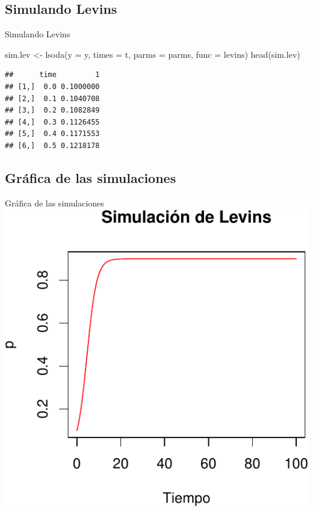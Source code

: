 \documentclass[
  11pt,
  ignorenonframetext,
]{beamer}
\newenvironment{Shaded}{}{}
\newcommand{\AttributeTok}[1]{\textcolor[rgb]{0.49,0.56,0.16}{#1}}
\newcommand{\FunctionTok}[1]{\textcolor[rgb]{0.02,0.16,0.49}{#1}}
\newcommand{\NormalTok}[1]{#1}
\newcommand{\OtherTok}[1]{\textcolor[rgb]{0.00,0.44,0.13}{#1}}
\begin{document}
\hypertarget{simulando-levins}{%
\subsection{Simulando Levins}\label{simulando-levins}}

\begin{frame}[fragile]{Simulando Levins}
\begin{Shaded}
\begin{Highlighting}[]
\NormalTok{sim.lev }\OtherTok{\textless{}{-}} \FunctionTok{lsoda}\NormalTok{(}\AttributeTok{y =}\NormalTok{ y, }\AttributeTok{times =}\NormalTok{ t, }
                 \AttributeTok{parms =}\NormalTok{ parms,}
                 \AttributeTok{func =}\NormalTok{ levins)}
\FunctionTok{head}\NormalTok{(sim.lev)}
\end{Highlighting}
\end{Shaded}

\begin{verbatim}
##      time         1
## [1,]  0.0 0.1000000
## [2,]  0.1 0.1040708
## [3,]  0.2 0.1082849
## [4,]  0.3 0.1126455
## [5,]  0.4 0.1171553
## [6,]  0.5 0.1218178
\end{verbatim}
\end{frame}

\hypertarget{gruxe1fica-de-las-simulaciones}{%
\subsection{Gráfica de las
simulaciones}\label{gruxe1fica-de-las-simulaciones}}

\begin{frame}{Gráfica de las simulaciones}
\includegraphics{deSolve_files/figure-beamer/unnamed-chunk-19-1.pdf}
\end{frame}
\end{document}
